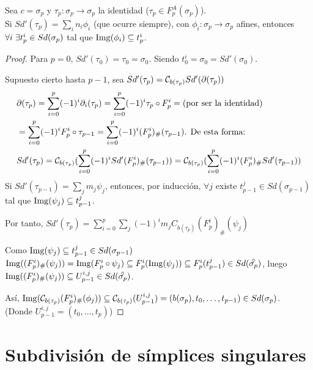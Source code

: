 Sea $c = \sigma_p$ y $\tau_p \colon \sigma_p \to \sigma_p$ la identidad ($\tau_p \in F_p^A(\sigma_p)$). \\
Si $Sd'(\tau_p) = \sum_i n_i \phi_i$ (que ocurre siempre), con $\phi_i \colon \sigma_p \to \sigma_p$ afines, entonces
$\forall i \hspace{0.3em} \exists t_p^i \in Sd(\sigma_p)$ tal que $\operatorname{Img}(\phi_i) \subseteq t_p^i$.

\begin{proof}
  Para $p = 0$, $Sd'(\tau_0) = \tau_0 = \sigma_0$. Siendo $t_0^i = \sigma_0 = Sd'(\sigma_0)$.

  Supuesto cierto hasta $p-1$, sea $Sd'(\tau_p) = {\mathcal C}_{b(\tau_p)} Sd'(\partial(\tau_p))$
  \begin{align*}
    &\partial(\tau_p) = \sum\limits_{i = 0}^p (-1)^i \partial_i(\tau_p) = \sum\limits_{i = 0}^p (-1)^i \tau_p \circ F_p^i = \text{(por ser la identidad)} \\
    &= \sum\limits_{i = 0}^p (-1)^i F_p^i \circ \tau_{p-1} = \sum\limits_{i = 0}^p (-1)^i(F_p^i)_\# (\tau_{p-1}) \text{. De esta forma:} \\
    &Sd'(\tau_p) = {\mathcal C}_{b(\tau_p)}(\sum\limits_{i = 0}^p (-1)^i Sd'(F_p^i)_\# (\tau_{p-1})) = {\mathcal C}_{b(\tau_p)}(\sum\limits_{i = 0}^p (-1)^i(F_p^i)_\# Sd'(\tau_{p-1}))
  \end{align*}
  Si $Sd'(\tau_{p-1}) = \sum\limits_j m_j \psi_j$, entonces, por inducción, $\forall j$ existe $t_{p-1}^j \in Sd(\sigma_{p-1})$ tal que
  $\operatorname{Img}(\psi_j) \subseteq t_{p-1}^j$.

  Por tanto, $Sd'(\tau_p) = \sum\limits_{i = 0}^p \sum\limits_j (-1)^i m_j C_{b(\tau_p)}(F_p^i)_\# (\psi_j)$

  Como $\operatorname{Img}(\psi_j) \subseteq t_{p-1}^j \in Sd(\sigma_{p-1})$
  $\Img((F_p^i)_\# (\psi_j)) = \Img(F_p^i \circ \psi_j) \subseteq F_p^i(\Img(\psi_j)) \subseteq F_p^i(t_{p-1}^j) \in Sd(\interior{\sigma_p})$,
  luego $\Img((F_p^i)_\# (\psi_j)) \subseteq U_{p-1}^{i,j} \in Sd(\interior{\sigma_p})$.

  Así, $\operatorname{Img}({\mathcal C}_{b(\tau_p)}(F_p^i)_\# (\phi_j)) \subseteq {\mathcal C}_{b(\tau_p)}(U_{p-1}^{i, j}) = (b(\sigma_p), t_0, \dots, t_{p-1}) \in Sd(\sigma_p)$.\\
  (Donde $U_{p-1}^{i,j} = (t_0, \dots, t_p)$)
\end{proof}

\section{Subdivisión de símplices singulares}

